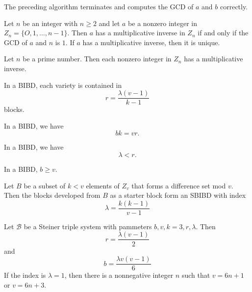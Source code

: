 \begin{theorem}
  \label{thm:10.1.1}
  The preceding algorithm terminates and computes the GCD of $a$ and $b$ correctly.
\end{theorem}

\begin{theorem}
  \label{thm:10.1.2}
  Let $n$ be an integer with $n \geq 2$ and let $a$ be a nonzero integer in $Z_n = \{O,1 ,\ldots, 
  n - 1\}$. Then $a$ has a multiplicative inverse in $Z_n$ if and only if the GCD of $a$ and $n$ is 
  $1$. If $a$ has a multiplicative inverse, then it is unique.
\end{theorem}

\begin{corollary}
  \label{cor:10.1.3}
  Let $n$ be a prime number. Then each nonzero integer in $Z_n$ has a multiplicative inverse.
\end{corollary}

\begin{theorem}
  \label{thm:10.2.1}
  In a BIBD, each variety is contained in
  \[ r = \frac{\lambda(v-1)}{k-1} \]
  blocks.
\end{theorem}

\begin{corollary}
  \label{cor:10.2.2}
  In a BIBD, we have
  \[ bk=vr. \]
\end{corollary}

\begin{corollary}
  \label{cor:10.2.3}
  In a BIBD, we have
  \[ \lambda < r. \]
\end{corollary}

\begin{theorem}
  \label{thm:10.2.4}
  In a BIBD, $b \geq v.$
\end{theorem}

\begin{theorem}
  \label{thm:10.2.5}
  Let $B$ be a subset of $k < v$ elements of $Z_v$ that forms a difference set mod $v$. Then the 
  blocks developed from $B$ as a starter block form an SBIBD with index
  \[ \lambda = \frac{k(k-1)}{v-1} \]
\end{theorem}

\begin{theorem}
  \label{thm:10.3.1}
  Let $\mathcal{B}$ be a Steiner triple system with pammeters $b, v, k = 3, r, \lambda$. Then
  \begin{equation}\label{10.4}
    r = \frac{\lambda(v-1)}{2}
  \end{equation}
  and 
  \begin{equation}\label{10.5}
    b = \frac{\lambda v(v-1)}{6}
  \end{equation}
  If the index is $\lambda = 1$, then there is a nonnegative integer $n$ such that $v = 6n +1$ or 
  $v = 6n +3$.
\end{theorem}

